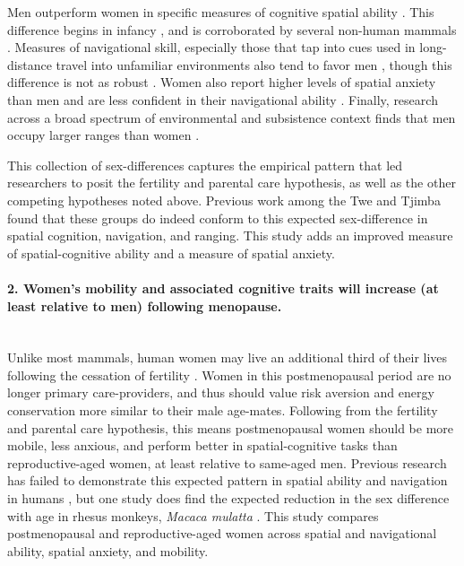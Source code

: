 Men outperform women in specific measures of cognitive spatial ability \citep{sanders1982sex, shepard1971mental, eals1994hunter, lawton2010gender}.  This difference begins in infancy \citep{quinn2008sex, moore2008mental, levine1999early}, and is corroborated by several non-human mammals \citep{javsarevic2012spatial, perdue2011sex, gaulin1986sex}.  Measures of navigational skill, especially those that tap into cues used in long-distance travel into unfamiliar environments also tend to favor men \citep{moffat1998navigation, bryant1982personality, galea1993sex, henrie1997gender}, though this difference is not as robust \citep{burke2012women, gilmartin1984comparing, montello1999comparison}.  Women also report higher levels of spatial anxiety than men and are less confident in their navigational ability \citep{devlin1995interactive, lawton1994gender, picucci2011besides}.  Finally, research across a broad spectrum of environmental and subsistence context finds that men occupy larger ranges than women \citep{ecuyer2004have, gaulin1988evolution, macdonald1999reproductive}.

This collection of sex-differences captures the empirical pattern that led researchers to posit the fertility and parental care hypothesis, as well as the other competing hypotheses noted above.  Previous work among the Twe and Tjimba found that these groups do indeed conform to this expected sex-difference in spatial cognition, navigation, and ranging.  This study adds an improved measure of spatial-cognitive ability and a measure of spatial anxiety.

\paragraph{2.  Women's mobility and associated cognitive traits will increase (at least relative to men) following menopause.}\mbox{}\\

Unlike most mammals, human women may live an additional third of their lives following the cessation of fertility \citep{hawkes2003grandmothers}.  Women in this postmenopausal period are no longer primary care-providers, and thus should value risk aversion and energy conservation more similar to their male age-mates.  Following from the fertility and parental care hypothesis, this means postmenopausal women should be more mobile, less anxious, and perform better in spatial-cognitive tasks than reproductive-aged women, at least relative to same-aged men.  Previous research has failed to demonstrate this expected pattern in spatial ability and navigation in humans \citep{willis1988gender, driscoll2005virtual, moffat2001age}, but one study does find the expected reduction in the sex difference with age in rhesus monkeys, \emph{Macaca mulatta} \cite{lacreuse1999spatial}.  This study compares postmenopausal and reproductive-aged women across spatial and navigational ability, spatial anxiety, and mobility.    

